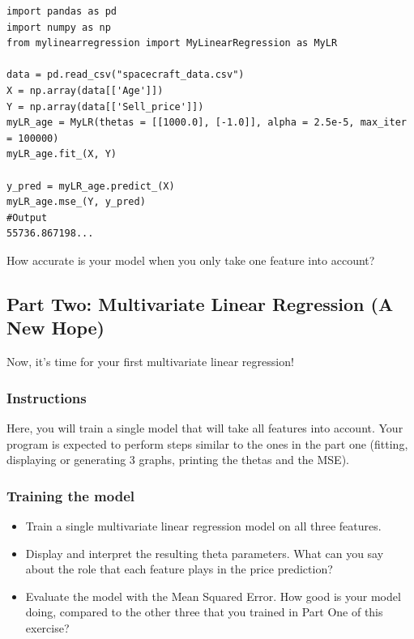 \documentclass{42-en}
\begin{document}
\begin{verbatim}
import pandas as pd
import numpy as np
from mylinearregression import MyLinearRegression as MyLR

data = pd.read_csv("spacecraft_data.csv")
X = np.array(data[['Age']])
Y = np.array(data[['Sell_price']])
myLR_age = MyLR(thetas = [[1000.0], [-1.0]], alpha = 2.5e-5, max_iter = 100000)
myLR_age.fit_(X, Y)

y_pred = myLR_age.predict_(X)
myLR_age.mse_(Y, y_pred)
#Output
55736.867198...
\end{verbatim}

How accurate is your model when you only take one feature into account?

\subsection*{Part Two: Multivariate Linear Regression (A New Hope)}

Now, it's time for your first multivariate linear regression!

\subsubsection*{Instructions}
Here, you will train a single model that will take all features into account.
Your program is expected to perform steps similar to the ones in the part one (fitting, displaying or generating 3 graphs, printing the thetas and the MSE).

\subsubsection*{Training the model}
\begin{itemize}
  \item Train a single multivariate linear regression model on all three features.
  \item Display and interpret the resulting theta parameters.
        What can you say about the role that each feature plays in the price prediction?
  \item Evaluate the model with the Mean Squared Error.
        How good is your model doing, compared to the other three that you trained in Part One of this exercise?
\end{itemize}
\end{document}
